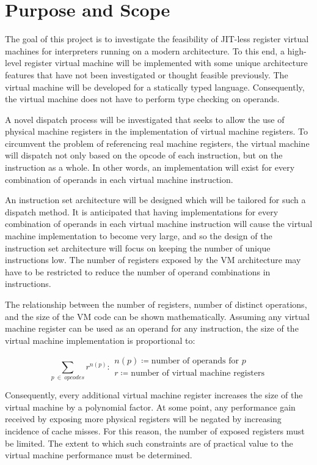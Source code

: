 	\section{Purpose and Scope}
		The goal of this project is to investigate the feasibility of JIT-less register virtual machines for interpreters running on a modern architecture. To this end, a high-level register virtual machine will be implemented with some unique architecture features that have not been investigated or thought feasible previously. The virtual machine will be developed for a statically typed language. Consequently, the virtual machine does not have to perform type checking on operands.
		
		A novel dispatch process will be investigated that seeks to allow the use of physical machine registers in the implementation of virtual machine registers. To circumvent the problem of referencing real machine registers, the virtual machine will dispatch not only based on the opcode of each instruction, but on the instruction as a whole. In other words, an implementation will exist for every combination of operands in each virtual machine instruction.
	
		An instruction set architecture will be designed which will be tailored for such a dispatch method. It is anticipated that having implementations for every combination of operands in each virtual machine instruction will cause the virtual machine implementation to become very large, and so the design of the instruction set architecture will focus on keeping the number of unique instructions low. The number of registers exposed by the VM architecture may have to be restricted to reduce the number of operand combinations in instructions.
		
		The relationship between the number of registers, number of distinct operations, and the size of the VM code can be shown mathematically. Assuming any virtual machine register can be used as an operand for any instruction, the size of the virtual machine implementation is proportional to:
		
		\[
		\sum_{p~\in~opcodes} r^{n(p)} : 
		\begin{array}{l}
		n(p) \coloneqq \text{number of operands for $p$} \\
		r \coloneqq \text{number of virtual machine registers}
		\end{array}
		\] 
		
		Consequently, every additional virtual machine register increases the size of the virtual machine by a polynomial factor. At some point, any performance gain received by exposing more physical registers will be negated by increasing incidence of cache misses. For this reason, the number of exposed registers must be limited. The extent to which such constraints are of practical value to the virtual machine performance must be determined.
		
